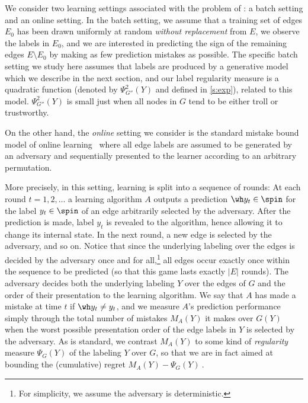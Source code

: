 \bigskip

We consider two learning settings associated with the problem of \esp{}: a batch
setting and an online setting. In the batch setting, we assume that a training set
of edges $E_0$ has been drawn uniformly at random \emph{without replacement} from $E$, we observe
the labels in $E_0$, and we are interested in predicting the sign of the remaining edges $E
\setminus E_0$ by making as few prediction mistakes as possible.
The specific batch setting
we study here assumes that labels are produced by a
generative model which we describe in the next section, and our label regularity measure is a
quadratic function (denoted by $\Psi^2_{G''}(Y)$ and defined in \autoref{s:exp}), related to this
model. $\Psi^2_{G''}(Y)$ is small just when all nodes in $G$ tend to be either troll or
trustworthy. 

On the other hand, the \emph{online} setting we consider is the standard mistake bound model of
online learning~\autocite{Winnow88} where all edge labels are assumed to be generated by an
adversary and sequentially presented to the learner according to an arbitrary permutation.
\iffalse
For an
online learning algorithm $A$, we are interested in measuring the total number of mistakes $M_A(Y)$
the algorithm makes over $G(Y)$ when the worst possible presentation order of the edge labels in
$Y$ is selected by the adversary.
\fi
More precisely,
  in this setting, learning is split into a sequence of rounds: At each round $t=1,2,\ldots$ a
  learning algorithm $A$ outputs a prediction ${\wh y_t} \in \spin$ for the label $y_t \in \spin$
  of an edge arbitrarily selected by the adversary. After the prediction is made, label $y_t$ is
  revealed to the algorithm, hence allowing it to change its internal state. In the next round, a
  new edge is selected by the adversary, and so on. Notice that since the underlying labeling over
  the edges is decided by the adversary once and for all,\footnote{For simplicity, we assume the
  adversary is deterministic.} all edges occur exactly once within the sequence to be predicted (so
  that this game lasts exactly $|E|$ rounds). The adversary decides both the underlying labeling
  $Y$ over the edges of $G$ and the order of their presentation to the learning algorithm. We say
  that $A$ has made a mistake at time $t$ if ${\wh y_t} \neq y_t$, and we measure $A$'s prediction
  performance simply through the total number of mistakes $M_A(Y)$ it makes over $G(Y)$ when the
  worst possible presentation order of the edge labels in $Y$ is selected by the adversary. As is
  standard, we contrast $M_A(Y)$ to some kind of \emph{regularity} measure $\Psi_G(Y)$ of the
  labeling $Y$ over $G$, so that we are in fact aimed at bounding the (cumulative) regret \( M_A(Y)
  - \Psi_G(Y)~.\)

